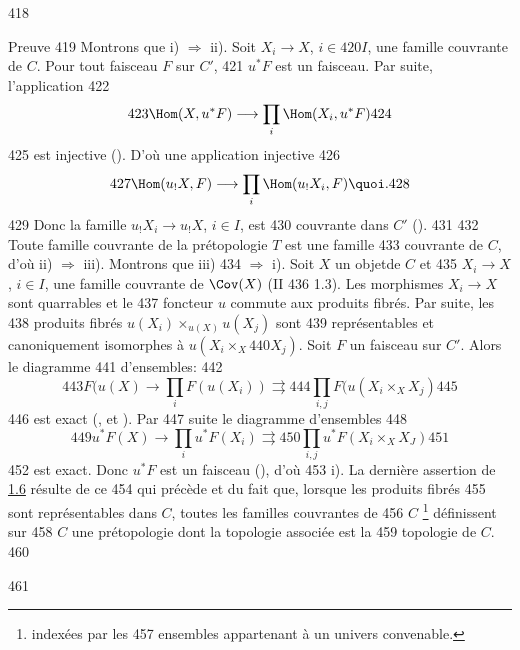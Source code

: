    418	\begin{enonce*}[remark]{Preuve}
   419	Montrons que i) $\Rightarrow$ ii). Soit $X_i\rightarrow X$, $i\in
   420	I$, une famille couvrante de $C$. Pour tout faisceau $F$ sur $C'$,
   421	$u^\ast F$ est un faisceau. Par suite, l'application
   422	$$
   423	\Hom(X,u^\ast F)\longrightarrow \prod_i\Hom(X_i,u^\ast F)
   424	$$
   425	est injective (). D'où une application injective
   426	$$
   427	\Hom(u_{!}X,F)\longrightarrow \prod_i \Hom(u_{!}X_i, F){\quoi}.
   428	$$
   429	Donc la famille $u_{!}X_i\rightarrow u_{!}X$, $i\in I$, est
   430	couvrante dans $C'$ ().
   431	
   432	Toute famille couvrante de la prétopologie $T$ est une famille
   433	couvrante de $C$, d'où ii) $\Rightarrow$ iii). Montrons que iii)
   434	$\Rightarrow$ i). Soit $X$ un objet\pageoriginale de $C$ et
   435	$X_i\rightarrow X$, $i\in I$, une famille couvrante de $\Cov(X)$ (II
   436	1.3). Les morphismes $X_i\rightarrow X$ sont quarrables et le
   437	foncteur $u$ commute aux produits fibrés. Par suite, les
   438	produits fibrés $u(X_i)\times_{u(X)} u(X_j)$ sont
   439	représentables et canoniquement isomorphes à $u(X_i\times_X
   440	X_j)$. Soit $F$ un faisceau sur $C'$. Alors le diagramme
   441	d'ensembles:
   442	$$
   443	F(u(X)\rightarrow \prod_i F(u(X_i))\rightrightarrows
   444	\prod_{i,j}F(u(X_i\times_X X_j)
   445	$$
   446	est exact (,  et ). Par
   447	suite le diagramme d'ensembles
   448	$$
   449	u^\ast F(X)\rightarrow \prod_i u^\ast F(X_i)\rightrightarrows
   450	\prod_{i,j}u^\ast F(X_i\times_X X_J)
   451	$$
   452	est exact. Donc $u^\ast F$ est un faisceau (), d'où
   453	i). La dernière assertion de \hyperref[III.prop1.6]{1.6} résulte de ce
   454	qui précède et du fait que, lorsque les produits fibrés
   455	sont représentables dans $C$, toutes les familles couvrantes de
   456	$C$ \footnote[1]{indexées par les
   457	  ensembles appartenant à un univers convenable.} définissent sur
   458	$C$ une prétopologie dont la topologie associée est la
   459	topologie de $C$.
   460	\end{enonce*}
   461	
